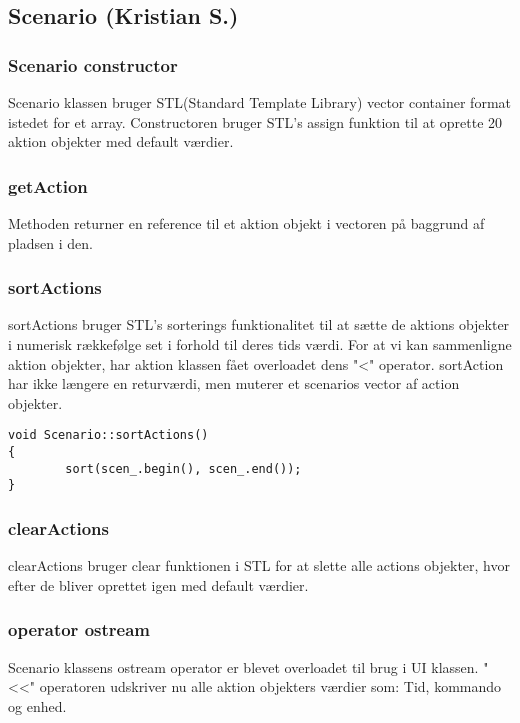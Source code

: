 \subsection{Scenario (Kristian S.)}

\subsubsection{Scenario constructor}

Scenario klassen bruger STL(Standard Template Library) vector container format istedet for et array. Constructoren bruger STL's assign funktion til at oprette 20 aktion objekter med default værdier.

\subsubsection{getAction}

Methoden returner en reference til et aktion objekt i vectoren på baggrund af pladsen i den.

\subsubsection{sortActions}

sortActions bruger STL's sorterings funktionalitet til at sætte de aktions objekter i numerisk rækkefølge set i forhold til deres tids værdi. For at vi kan sammenligne aktion objekter, har aktion klassen fået overloadet dens "<" operator. sortAction har ikke længere en returværdi, men muterer et scenarios vector af action objekter.

\begin{lstlisting}
void Scenario::sortActions()
{
		sort(scen_.begin(), scen_.end());
}
\end{lstlisting}

\subsubsection{clearActions}

clearActions bruger clear funktionen i STL for at slette alle actions objekter, hvor efter de bliver oprettet igen med default værdier.


\subsubsection{operator ostream}

Scenario klassens ostream operator er blevet overloadet til brug i UI klassen. "<<" operatoren udskriver nu alle aktion objekters værdier som: Tid, kommando og enhed.


\clearpage